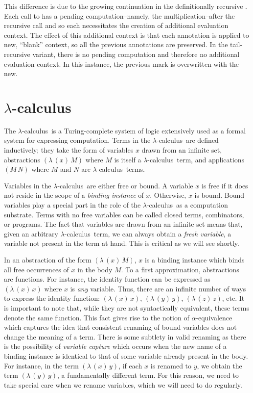 \documentclass[ms,electronic,twosidetoc,letterpaper,chaptercenter,parttop]{byumsphd}
\newcommand{\lc}{$\lambda$-calculus}
\newcommand{\abs}[2]{(\lambda\,(#1)\,#2)}
\newcommand{\app}[2]{(#1\,#2)}
\begin{document}
This difference is due to the growing continuation in the definitionally recursive
. Each call to  has a pending computation--namely, the
multiplication--after the recursive call and so each necessitates the creation of
additional evaluation context. The effect of this additional context is that each
annotation is applied to new, ``blank'' context, so all the previous annotations are
preserved. In the tail-recursive variant, there is no pending computation and therefore no
additional evaluation context. In this instance, the previous mark is overwritten with the
new.

\chapter{\lc}

The \lc\ is a Turing-complete system of logic extensively used as a formal system for
expressing computation. Terms in the \lc\ are defined inductively; they take the form of
variables $x$ drawn from an infinite set, abstractions $\abs{x}{M}$ where $M$ is itself a
\lc\ term, and applications $\app{M}{N}$ where $M$ and $N$ are \lc\ terms.

Variables in the \lc\ are either free or bound. A variable $x$ is free if it does not
reside in the scope of a \emph{binding instance} of $x$. Otherwise, $x$ is bound. Bound
variables play a special part in the role of the \lc\ as a computation substrate. Terms
with no free variables can be called closed terms, combinators, or programs. The fact that
variables are drawn from an infinite set means that, given an arbitrary \lc\ term, we can
always obtain a \emph{fresh variable}, a variable not present in the term at hand. This is
critical as we will see shortly.

In an abstraction of the form $\abs{x}{M}$, $x$ is a binding instance which binds all free
occurrences of $x$ in the body $M$. To a first approximation, abstractions are functions.
For instance, the identity function can be expressed as $\abs{x}{x}$ where $x$ is
\emph{any} variable. Thus, there are an infinite number of ways to express the identity
function: $\abs{x}{x}$, $\abs{y}{y}$, $\abs{z}{z}$, etc. It is important to note that,
while they are not syntactically equivalent, these terms denote the same function. This
fact gives rise to the notion of $\alpha$-equivalence which captures the idea that
consistent renaming of bound variables does not change the meaning of a term. There is
some subtlety in valid renaming as there is the possibility of \emph{variable capture}
which occurs when the new name of a binding instance is identical to that of some variable
already present in the body. For instance, in the term $\abs{x}{y}$, if each $x$ is
renamed to $y$, we obtain the term $\abs{y}{y}$, a fundamentally different term. For this
reason, we need to take special care when we rename variables, which we will need to do
regularly.
\end{document}
